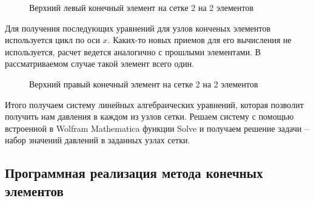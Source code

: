 \documentclass[a4paper,14pt]{extarticle}
\begin{document}
\begin{figure}[!htbp]
	\caption{Верхний левый конечный элемент на сетке 2 на 2 элементов}
	\label{left-top-el}
\end{figure}
\newpage
Для получения последующих уравнений для узлов конченых элементов используется цикл по оси $x$. Каких-то новых приемов для его вычисления не используется, расчет ведется аналогично с прошлыми элементами. В рассматриваемом случае такой элемент всего один.
\begin{figure}[!htbp]
	\caption{Верхний правый конечный элемент на сетке 2 на 2 элементов}
	\label{right-top-el}
\end{figure}

Итого получаем систему линейных алгебраических уравнений, которая позволит получить нам давления в каждом из узлов сетки. Решаем систему с помощью встроенной в Wolfram Mathematica функции Solve и получаем решение задачи -- набор значений давлений в заданных узлах сетки.

\subsection{Программная реализация метода конечных элементов}
\end{document}
